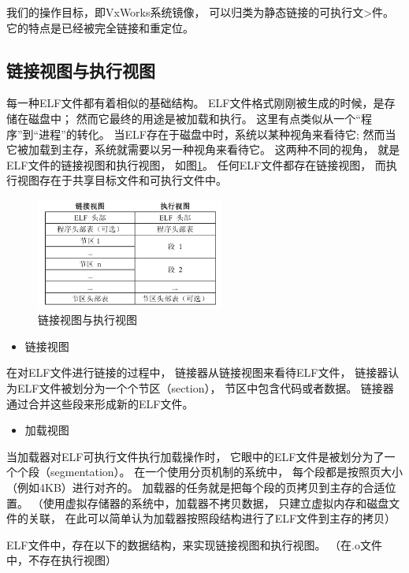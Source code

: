我们的操作目标，即VxWorks系统镜像，
可以归类为静态链接的可执行文>件。
它的特点是已经被完全链接和重定位。

\subsection{链接视图与执行视图}

每一种ELF文件都有着相似的基础结构。
ELF文件格式刚刚被生成的时候，是存储在磁盘中；
然而它最终的用途是被加载和执行。
这里有点类似从一个“程序”到“进程”的转化。
当ELF存在于磁盘中时，系统以某种视角来看待它;
然而当它被加载到主存，系统就需要以另一种视角来看待它。
这两种不同的视角，
就是ELF文件的链接视图和执行视图，
如图\ref{elf-map}。
任何ELF文件都存在链接视图，
而执行视图存在于共享目标文件和可执行文件中。

\begin{figure}[h!]
  \centering
  \includegraphics[width=0.55\textwidth]{figure/elf-map.png}
  \caption{链接视图与执行视图}
  \label{elf-map}
\end{figure}

\begin{itemize}
  \item 链接视图
\end{itemize}

在对ELF文件进行链接的过程中，
链接器从链接视图来看待ELF文件，
链接器认为ELF文件被划分为一个个节区（section），
节区中包含代码或者数据。
链接器通过合并这些段来形成新的ELF文件。

\begin{itemize}
  \item 加载视图
\end{itemize}


当加载器对ELF可执行文件执行加载操作时，
它眼中的ELF文件是被划分为了一个个段（segmentation）。
在一个使用分页机制的系统中，
每个段都是按照页大小（例如4KB）进行对齐的。
加载器的任务就是把每个段的页拷贝到主存的合适位置。
（使用虚拟存储器的系统中，加载器不拷贝数据，
只建立虚拟内存和磁盘文件的关联，
在此可以简单认为加载器按照段结构进行了ELF文件到主存的拷贝）

ELF文件中，存在以下的数据结构，来实现链接视图和执行视图。
（在.o文件中，不存在执行视图）

